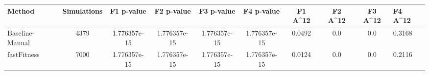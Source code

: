 \begin{tabular}{lcccccccc}
\toprule
         Method &  Simulations &   F1 p-value &   F2 p-value &   F3 p-value &   F4 p-value &  F1 A^12 &  F2 A^12 &  F3 A^12 &  F4 A^12 \\
\midrule
Baseline-Manual &         4379 & 1.776357e-15 & 1.776357e-15 & 1.776357e-15 & 1.776357e-15 &   0.0492 &      0.0 &      0.0 &   0.3168 \\
    fastFitness &         7000 & 1.776357e-15 & 1.776357e-15 & 1.776357e-15 & 1.776357e-15 &   0.0124 &      0.0 &      0.0 &   0.2116 \\
\bottomrule
\end{tabular}
